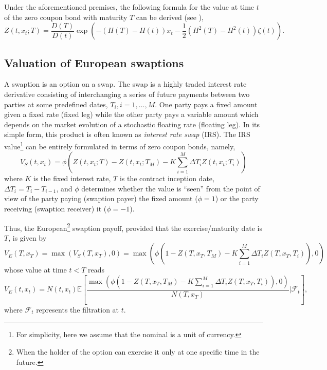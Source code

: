         Under the aforementioned premises, the following formula for the value at time $t$ of the zero coupon bond with maturity $T$ can be derived (see \cite{hagan2002}),
        \begin{equation*}
            Z(t, x_t; T) = \frac{D(T)}{D(t)}\exp\left(-(H(T) - H(t))x_t - \frac{1}{2}(H^2(T) - H^2(t))\zeta(t)\right).
        \end{equation*}

    
    \subsection{Valuation of European swaptions}\label{sec:european}

        A swaption is an option on a swap. The swap is a highly traded interest rate derivative consisting of interchanging a series of future payments between two parties at some predefined dates, $T_i, i=1, \dots, M$. One party pays a fixed amount given a fixed rate (fixed leg) while the other party pays a variable amount which depends on the market evolution of a stochastic floating rate (floating leg). In its simple form, this product is often known as \emph{interest rate swap} (IRS). The IRS value\footnote{For simplicity, here we assume that the nominal is a unit of currency.} can be entirely formulated in terms of zero coupon bonds, namely,
        \begin{equation*}
            V_S(t, x_t) = \phi\left(Z(t, x_t; T) - Z(t, x_t; T_M) - K\sum_{i = 1}^M \Delta T_i Z(t, x_t; T_i)\right)
        \end{equation*}
        where $K$ is the fixed interest rate, $T$ is the contract inception date, $\Delta T_i = T_i - T_{i-1}$, and $\phi$ determines whether the value is ``seen'' from the point of view of the party paying (swaption payer) the fixed amount ($\phi = 1$) or the party receiving (swaption receiver) it ($\phi = -1$).

        Thus, the European\footnote{When the holder of the option can exercise it only at one specific time in the future.} swaption payoff, provided that the exercise/maturity date is $T$, is given by
        \begin{equation*}
            V_E(T, x_T) = \max\left(V_S(T, x_T), 0\right) = \max\left(\phi\left(1 - Z(T, x_T, T_M) - K\sum_{i = 1}^M \Delta T_i Z(T, x_T, T_i)\right), 0\right)
        \end{equation*}
        whose value at time $t < T$ reads
        \begin{equation*}
            V_E(t, x_t) = N(t, x_t)\mathbb{E} \left[\frac{\max\left(\phi\left(1 - Z(T, x_T, T_M) - K\sum_{i = 1}^M \Delta T_i Z(T, x_T, T_i)\right), 0\right)}{N(T, x_T)} \Bigg| \mathcal{F}_t\right],
        \end{equation*}
        where $\mathcal{F}_t$ represents the filtration at $t$.


